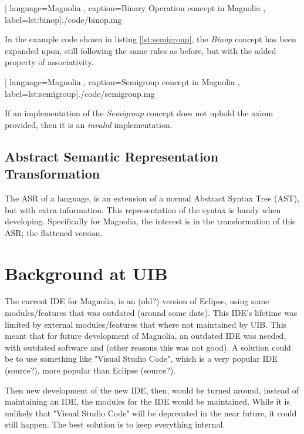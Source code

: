 \begin{center}
  
    [ language=Magnolia
    , caption={Binary Operation concept in Magnolia}
    , label=lst:binop]{./code/binop.mg}
\end{center}

In the example code shown in listing \ref{lst:semigroup}, the \textit{Binop}
concept has been expanded upon, still following the same rules as before, but
with the added property of associativity.

\begin{center}
  
    [ language=Magnolia
    , caption={Semigroup concept in Magnolia}
    , label=lst:semigroup]{./code/semigroup.mg}
\end{center}

If an implementation of the \textit{Semigroup} concept does not uphold the axiom
provided, then it is an \textit{invalid} implementation.

\subsection{Abstract Semantic Representation Transformation}

The ASR of a language, is an extension of a normal Abstract Syntax Tree (AST),
but with extra information. This representation of the syntax is handy when
developing. Specifically for Magnolia, the interest is in the transformation of
this ASR; the flattened version.

\section{Background at UIB}

The current IDE for Magnolia, is an (old?) version of Eclipse, using some
modules/features that was outdated (around some date). This IDE's lifetime was
limited by external modules/features that where not maintained by UIB. This
meant that for future development of Magnolia, an outdated IDE was needed, with
outdated software and (other reasons this was not good). A solution could be to
use something like "Visual Studio Code", which is a very popular IDE (source?),
more popular than Eclipse (source?).

Then new development of the new IDE, then, would be turned around, instead of
maintaining an IDE, the modules for the IDE would be maintained. While it is
unlikely that "Visual Studio Code" will be deprecated in the near future, it
could still happen. The best solution is to keep everything internal.


